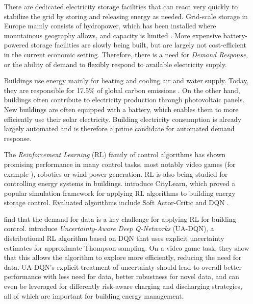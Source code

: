 There are dedicated electricity storage facilities that can react very quickly to stabilize the grid by storing and releasing energy as needed.
Grid-scale storage in Europe mainly consists of hydropower, which has been installed where mountainous geography allows, and capacity is limited \citep{gimeno-gutierrez2015AssessmentEuropeanPotential}.
More expensive battery-powered storage facilities are slowly being built, but are largely not cost-efficient in the current economic setting.
Therefore, there is a need for \emph{Demand Response}, or the ability of demand to flexibly respond to available electricity supply.

Buildings use energy mainly for heating and cooling air and water supply.
Today, they are responsible for 17.5\% of global carbon emissions \citep{ritchie2020COGreenhouseGas}.
On the other hand, buildings often contribute to electricity production through photovoltaic panels. New buildings are often equipped with a battery, which enables them to more efficiently use their solar electricity.
Building electricity consumption is already largely automated and is therefore a prime candidate for automated demand response.

The \emph{Reinforcement Learning} (RL) family of control algorithms has shown promising performance in many control tasks, most notably video games (for example \cite{mnih2015HumanlevelControlDeep}), robotics \citep{latifi2020ModelFreeControlDynamicField} or wind power generation\citep{zhang2020ResearchAGCPerformance}.
RL is also being studied for controlling energy systems in buildings.
\cite{vazquez-canteli2020CityLearnStandardizingResearch} introduce CityLearn, which proved a popular simulation framework for applying RL algorithms to building energy storage control. Evaluated algorithms include Soft Actor-Critic \citep{pinto2021CoordinatedEnergyManagement} and DQN \citep{schreiber2020ApplicationTwoPromising}.

\cite{wang2020ReinforcementLearningBuilding} find that the demand for data is a key challenge for applying RL for building control.
\cite{clements2020EstimatingRiskUncertainty} introduce \emph{Uncertainty-Aware Deep Q-Networks} (UA-DQN), a distributional RL algorithm based on DQN \citep{mnih2015HumanlevelControlDeep} that uses explicit uncertainty estimates for approximate Thompson sampling.
On a video game task, they show that this allows the algorithm to explore more efficiently, reducing the need for data.
UA-DQN's explicit treatment of uncertainty should lead to overall better performance with less need for data, better robustness for novel data, and can even be leveraged for differently risk-aware charging and discharging strategies, all of which are important for building energy management.

